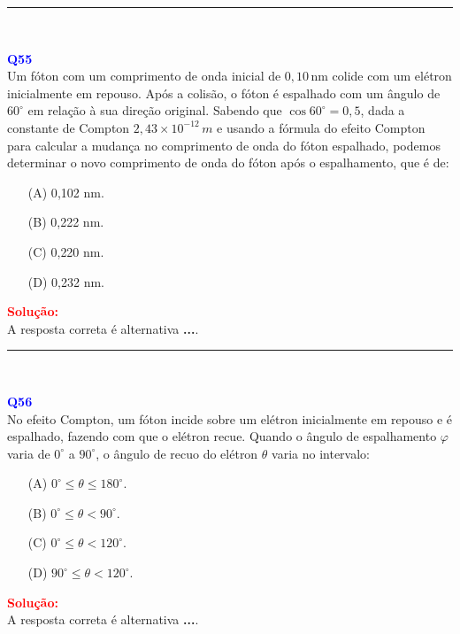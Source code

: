 \documentclass[a4paper,12pt]{article}
\begin{document}
\noindent\rule{\linewidth}{0.6pt}\\

\begin{flushleft}
\textbf{\textcolor{blue}{\Large Q55}}\\
\noindent
Um fóton com um comprimento de onda inicial de \(0,10\,\text{nm}\) colide com um elétron inicialmente em repouso.  
Após a colisão, o fóton é espalhado com um ângulo de \(60^\circ\) em relação à sua direção original.  
Sabendo que \(\cos 60^\circ = 0,5\), dada a constante de Compton \(2,43 \times 10^{-12}\,m\) e usando a fórmula do 
efeito Compton para calcular a mudança no comprimento de onda do fóton espalhado, podemos determinar o novo comprimento 
de onda do fóton após o espalhamento, que é de:


\begin{itemize}
\item[(A)] 0{,}102 nm.
\item[(B)] 0{,}222 nm.
\item[(C)] 0{,}220 nm.
\item[(D)] 0{,}232 nm.
\end{itemize}

\vspace{0.5cm}

\textcolor{red}{\textbf{Solução:}}\\

A resposta correta é alternativa \colorbox{green!50}{\textbf{...}}.
\end{flushleft}

\noindent\rule{\linewidth}{0.6pt}\\

\begin{flushleft}
\textbf{\textcolor{blue}{\Large Q56}}\\
\noindent
No efeito Compton, um fóton incide sobre um elétron inicialmente em repouso e é espalhado, fazendo com que o elétron recue.  
Quando o ângulo de espalhamento \( \varphi \) varia de \(0^\circ\) a \(90^\circ\), o ângulo de recuo do elétron \( \theta \) 
varia no intervalo:


\begin{itemize}
\item[(A)] $0^{\circ} \leq \theta \leq 180^{\circ}$.
\item[(B)] $0^{\circ} \leq \theta < 90^{\circ}$.
\item[(C)] $0^{\circ} \leq \theta < 120^{\circ}$.
\item[(D)] $90^{\circ} \leq \theta < 120^{\circ}$.
\end{itemize}

\vspace{0.5cm}

\textcolor{red}{\textbf{Solução:}}\\

A resposta correta é alternativa \colorbox{green!50}{\textbf{...}}.
\end{flushleft}
\end{document}

